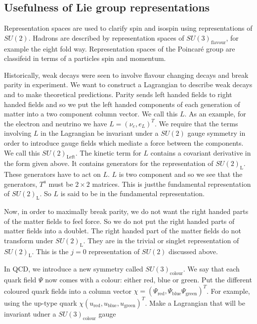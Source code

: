 \subsection{Usefulness of Lie group representations}
Representation spaces are used to clarify spin and isospin using
representations of $SU(2)$. Hadrons are described by representation spaces of
$SU(3)_{\mathrm{flavour}}$, for example the eight fold way. Representation
spaces of the Poincar\'e group are classifeid in terms of a particles spin
and momentum.
\par Historically, weak decays were seen to involve flavour changing decays and 
break parity in experiment. We want to construct a Lagrangian to describe weak
decays and to make theoretical predictions. Parity sends left handed fields to
right handed fields and so we put the left handed components of each generation
of matter into a two component column vector. We call this $L$. As an example,
for the electron and neutrino we have $L=(\nu_e, e_L)^T$. We require that
the terms involving $L$ in the Lagrangian be invariant under a $SU(2)$ gauge
symmetry in order to introduce gauge fields which mediate a force between the
components. We call this $SU(2)_{\mathrm{Left}}$. The kinetic term for $L$
contains a covariant derivative in the form given above. It contains generators 
for the representation of $SU(2)_{\mathrm{L}}$. These generators have to act on
$L$. $L$ is two component and so we see that the generators, $T^a$ must be
$2\times 2$ matrices. This is justthe fundamental representation of
$SU(2)_\mathrm{L}$. So $L$ is said to be in the fundamental representation.
\par Now, in order to maximally break parity, we do not want the right handed
parts of the matter fields to feel force. So we do not put the right handed
parts of matter fields into a doublet. The  right handed part of the matter 
fields do not transform under $SU(2)_\mathrm{L}$. They are in the trivial or
singlet representation of $SU(2)_\mathrm{L}$. This is the $j=0$ representation
of $SU(2)$ discussed above.
\par In QCD, we introduce a new symmetry called $SU(3)_\mathrm{colour}$. We say
that each quark field $\Psi$ now comes with a colour: either red, blue or
green. Put the different coloured quark fields into a column vector $\chi
= \left(\Psi_\mathrm{red},\Psi_\mathrm{blue}\Psi_\mathrm{green}\right)^T$. For 
example, using the up-type quark
$\chi\left(u_\mathrm{red},u_\mathrm{blue},u_\mathrm{green}\right)^T$. Make
a Lagrangian that will be invariant udner a $SU(3)_\mathrm{colour}$ gauge
